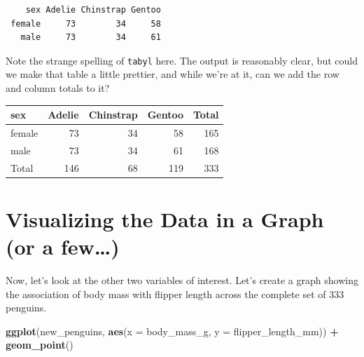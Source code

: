 \documentclass[
]{book}
\newenvironment{Shaded}{\begin{snugshade}}{\end{snugshade}}
\newcommand{\CommentTok}[1]{\textcolor[rgb]{0.56,0.35,0.01}{\textit{#1}}}
\newcommand{\DataTypeTok}[1]{\textcolor[rgb]{0.13,0.29,0.53}{#1}}
\newcommand{\KeywordTok}[1]{\textcolor[rgb]{0.13,0.29,0.53}{\textbf{#1}}}
\newcommand{\NormalTok}[1]{#1}
\newcommand{\OperatorTok}[1]{\textcolor[rgb]{0.81,0.36,0.00}{\textbf{#1}}}
\newcommand{\StringTok}[1]{\textcolor[rgb]{0.31,0.60,0.02}{#1}}
\begin{document}
\begin{verbatim}
    sex Adelie Chinstrap Gentoo
 female     73        34     58
   male     73        34     61
\end{verbatim}

Note the strange spelling of \texttt{tabyl} here. The output is reasonably clear, but could we make that table a little prettier, and while we're at it, can we add the row and column totals to it?

\begin{Shaded}
\end{Shaded}

\begin{tabular}{l|r|r|r|r}
\hline
sex & Adelie & Chinstrap & Gentoo & Total\\
\hline
female & 73 & 34 & 58 & 165\\
\hline
male & 73 & 34 & 61 & 168\\
\hline
Total & 146 & 68 & 119 & 333\\
\hline
\end{tabular}

\hypertarget{visualizing-the-data-in-a-graph-or-a-few}{%
\section{Visualizing the Data in a Graph (or a few\ldots)}\label{visualizing-the-data-in-a-graph-or-a-few}}

Now, let's look at the other two variables of interest. Let's create a graph showing the association of body mass with flipper length across the complete set of 333 penguins.

\begin{Shaded}
\begin{Highlighting}[]
\KeywordTok{ggplot}\NormalTok{(new_penguins, }\KeywordTok{aes}\NormalTok{(}\DataTypeTok{x =}\NormalTok{ body_mass_g, }\DataTypeTok{y =}\NormalTok{ flipper_length_mm)) }\OperatorTok{+}
\StringTok{    }\KeywordTok{geom_point}\NormalTok{() }
\end{Highlighting}
\end{Shaded}
\end{document}
